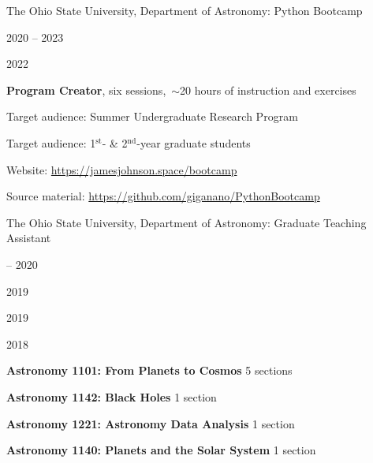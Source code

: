 \documentclass[cv.tex]{subfiles}
\begin{document}
{\color{themecolor} \large The Ohio State University, Department of Astronomy:
Python Bootcamp}
\par\noindent
\parbox{0.18\textwidth}{%
	\vspace{2mm}
	\raggedleft
	\null \par
	2020 -- 2023 \par
	2022 \par
	\null \par
	\null
}
\hspace{1mm}
\parbox{0.73\textwidth}{%
	\textbf{Program Creator}, six sessions,~$\sim$20 hours of instruction
	and exercises \par
	Target audience: Summer Undergraduate Research Program \par
	Target audience: 1$^\text{st}$- \& 2$^\text{nd}$-year graduate students \par
	Website: {\small \url{https://jamesjohnson.space/bootcamp}} \par
	Source material: 
	{\small \url{https://github.com/giganano/PythonBootcamp}}
}

\par\null\par\null\par\noindent
{\color{themecolor} \large The Ohio State University, Department of Astronomy:
Graduate Teaching Assistant}
\par\noindent
\parbox{0.18\textwidth}{%
	 -- 2020 \par
	2019 \par
	2019 \par
	2018
}
\hspace{1mm}
\parbox{0.8\textwidth}{%
	\vspace{1mm}
	\textbf{Astronomy 1101: From Planets to Cosmos} \hfill 5 sections \par
	\textbf{Astronomy 1142: Black Holes} \hfill 1 section \par
	\textbf{Astronomy 1221: Astronomy Data Analysis} \hfill 1 section \par
	\textbf{Astronomy 1140: Planets and the Solar System} \hfill 1 section \par
}
\end{document}
